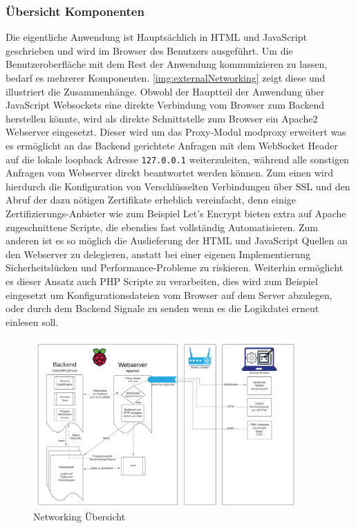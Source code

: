 \subsubsection{Übersicht Komponenten}
Die eigentliche Anwendung ist Hauptsächlich in HTML und JavaScript geschrieben und wird im Browser des Benutzers ausgeführt. Um die Benutzeroberfläche mit dem Rest der Anwendung kommunizieren zu lassen, bedarf es mehrerer Komponenten. \autoref{img:externalNetworking} zeigt diese und illustriert die Zusammenhänge. Obwohl der Hauptteil der Anwendung über JavaScript Websockets eine direkte Verbindung vom Browser zum Backend herstellen könnte, wird als direkte Schnittstelle zum Browser ein Apache2 Webserver eingesetzt. Dieser wird um das Proxy-Modul modproxy erweitert was es ermöglicht an das Backend gerichtete Anfragen mit dem WebSocket Header auf die lokale loopback Adresse \texttt{127.0.0.1} weiterzuleiten, während alle sonstigen Anfragen vom Webserver direkt beantwortet werden können. Zum einen wird hierdurch die Konfiguration von Verschlüsselten Verbindungen über SSL und den Abruf der dazu nötigen Zertifikate erheblich vereinfacht, denn einige Zertifizierungs-Anbieter wie zum Beispiel Let's Encrypt \cite{URL:LetsEncrypt} bieten extra auf Apache zugeschnittene Scripte, die ebendies fast vollständig Automatisieren. Zum anderen ist es so möglich die Auslieferung der HTML und JavaScript Quellen an den Webserver zu delegieren, anstatt bei einer eigenen Implementierung Sicherheitslücken und Performance-Probleme zu riskieren. Weiterhin ermöglicht es dieser Ansatz auch PHP Scripte zu verarbeiten, dies wird zum Beispiel eingesetzt um Konfigurationsdateien vom Browser auf dem Server abzulegen, oder durch dem Backend Signale zu senden wenn es die Logikdatei erneut einlesen soll.

\begin{figure}[H]
	\begin{center}
		\includegraphics[width=0.9\textwidth ,clip]{./images/BackendFrontend.pdf}
		\caption{Networking Übersicht}
		\label{img:externalNetworking}
	\end{center} 
\end{figure}
